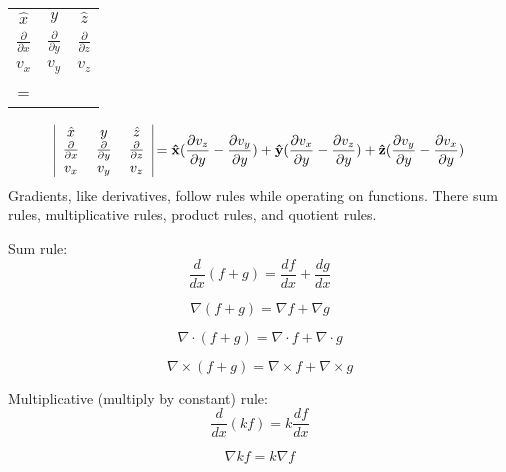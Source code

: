 \begin{center}
	\begin{tabular}{|ccc|}
	$\hat{x}$ & ${y}$ & $\hat{z}$ \\
	$\frac{\partial{}}{\partial{x}}$ & $\frac{\partial{}}{\partial{y}} $ & $\frac{\partial{}}{\partial{z}}$  \\
	$v_x$ & $v_y$  &$v_z $ \\ =
	\end{tabular}
\end{center}

\begin{equation}
\begin{tabular}{|ccc|}
$\hat{x}$ & ${y}$ & $\hat{z}$ \\
$\frac{\partial{}}{\partial{x}}$ & $\frac{\partial{}}{\partial{y}} $ & $\frac{\partial{}}{\partial{z}}$  \\
$v_x$ & $v_y$  &$v_z $ 
\end{tabular}
= \mathbf{\hat{x}}(\frac{\partial{v_z}}{\partial{y}}-\frac{\partial{v_y}}{\partial{y}}) + \mathbf{\hat{y}}(\frac{\partial{v_x}}{\partial{y}}-\frac{\partial{v_z}}{\partial{y}}) + \mathbf{\hat{z}}(\frac{\partial{v_y}}{\partial{y}}-\frac{\partial{v_x}}{\partial{y}})
\end{equation}
 \newpage
Gradients, like derivatives, follow rules while operating on functions. There sum rules, multiplicative rules, product rules, and quotient rules.
\bigskip

Sum rule:
\begin{equation}
\frac{d}{dx}(f + g) = \frac{df}{dx} + \frac{dg}{dx}
\end{equation}

\begin{equation}
\nabla{(f+g)}=\nabla{f}+\nabla{g}
\end{equation}

\begin{equation}
\nabla{} \cdot (f+g) = \nabla{} \cdot f + \nabla{} \cdot  g
\end{equation}

\begin{equation}
\nabla \times (f+g) = \nabla \times f + \nabla \times g
\end{equation}

Multiplicative (multiply by constant) rule:
\begin{equation}
\frac{d}{dx}(kf) = k\frac{df}{dx}
\end{equation}

\begin{equation}
\nabla{kf} = k\nabla{f}
\end{equation}

